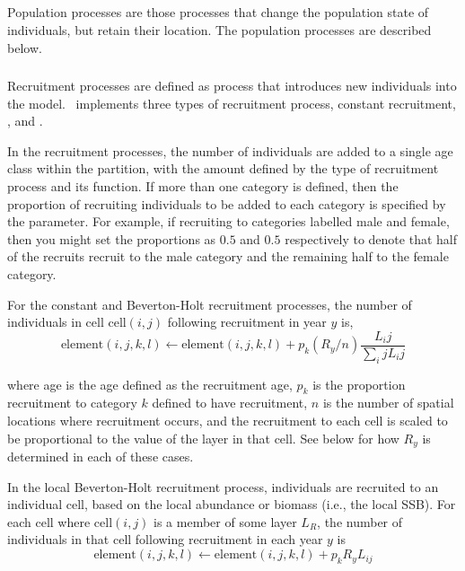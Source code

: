 \subsection{}

Population processes are those processes that change the population state of individuals, but retain their location. The population processes are described below.

\subsubsection{}

Recruitment processes are defined as  process that introduces new individuals into the model. \SPM\ implements three types of recruitment process, constant recruitment,   \citep{1203}, and .

In the recruitment processes, the number of individuals are added to a single age class within the partition, with the amount defined by the type of recruitment process and its function. If more than one category is defined, then the proportion of recruiting individuals to be added to each category is specified by the  parameter. For example, if recruiting to categories labelled male and female, then you might set the proportions as $0.5$ and $0.5$ respectively to denote that half of the recruits recruit to the male category and the remaining half to the female category.

For the constant and Beverton-Holt recruitment processes, the  number of individuals in cell cell$(i,j)$ following recruitment in year $y$ is,  
\begin{equation}
  \text{element}(i,j,k,l) \leftarrow \text{element}(i,j,k,l) + p_k(R_y / n) \frac{L_ij}{\sum_ij L_ij}
\end{equation}

where age is the age defined as the recruitment age, $p_k$ is the proportion recruitment to category $k$ defined to have recruitment, $n$ is the number of spatial locations where recruitment occurs, and the recruitment to each cell is scaled to be proportional to the value of the layer in that cell. See below for how $R_y$ is determined in each of these cases.

In the local Beverton-Holt recruitment process, individuals are recruited to an individual cell, based on the local abundance or biomass (i.e., the local SSB). For each cell where cell$(i,j)$ is a member of some layer $L_R$, the number of individuals in that cell following recruitment in each year $y$ is 
\begin{equation}
  \text{element}(i,j,k,l) \leftarrow \text{element}(i,j,k,l) + p_k R_y L_{ij}
\end{equation}


